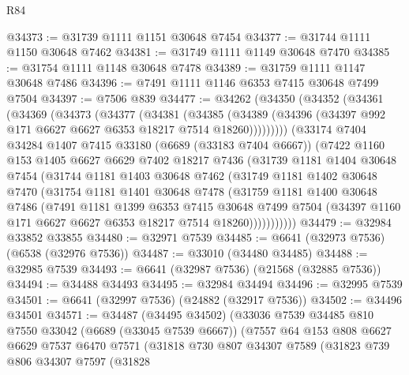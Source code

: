 \begin{lexlean}{R84}
\begin{coremodule}
@34373 := @31739 @1111 @1151 @30648 @7454
@34377 := @31744 @1111 @1150 @30648 @7462
@34381 := @31749 @1111 @1149 @30648 @7470
@34385 := @31754 @1111 @1148 @30648 @7478
@34389 := @31759 @1111 @1147 @30648 @7486
@34396 := @7491 @1111 @1146 @6353 @7415 @30648 @7499 @7504
@34397 := @7506 @839
@34477 := @34262
    (@34350
      (@34352
        (@34361
          (@34369
            (@34373
              (@34377
                (@34381
                  (@34385
                    (@34389 (@34396 (@34397 @992 @171 @6627 @6627 @6353 @18217 @7514 @18260)))))))))
        (@33174
          @7404
          @34284
          @1407
          @7415
          @33180
          (@6689 (@33183 @7404 @6667))
          (@7422
            @1160
            @153
            @1405
            @6627
            @6629
            @7402
            @18217
            @7436
            (@31739
              @1181
              @1404
              @30648
              @7454
              (@31744
                @1181
                @1403
                @30648
                @7462
                (@31749
                  @1181
                  @1402
                  @30648
                  @7470
                  (@31754
                    @1181
                    @1401
                    @30648
                    @7478
                    (@31759
                      @1181
                      @1400
                      @30648
                      @7486
                      (@7491
                        @1181
                        @1399
                        @6353
                        @7415
                        @30648
                        @7499
                        @7504
                        (@34397 @1160 @171 @6627 @6627 @6353 @18217 @7514 @18260)))))))))))
@34479 := @32984 @33852 @33855
@34480 := @32971 @7539
@34485 := @6641 (@32973 @7536) (@6538 (@32976 @7536))
@34487 := @33010 (@34480 @34485)
@34488 := @32985 @7539
@34493 := @6641 (@32987 @7536) (@21568 (@32885 @7536))
@34494 := @34488 @34493
@34495 := @32984 @34494
@34496 := @32995 @7539
@34501 := @6641 (@32997 @7536) (@24882 (@32917 @7536))
@34502 := @34496 @34501
@34571 := @34487
    (@34495 @34502)
    (@33036
      @7539
      @34485
      @810
      @7550
      @33042
      (@6689 (@33045 @7539 @6667))
      (@7557
        @64
        @153
        @808
        @6627
        @6629
        @7537
        @6470
        @7571
        (@31818
          @730
          @807
          @34307
          @7589
          (@31823
            @739
            @806
            @34307
            @7597
            (@31828

\end{coremodule}
\end{lexlean}
